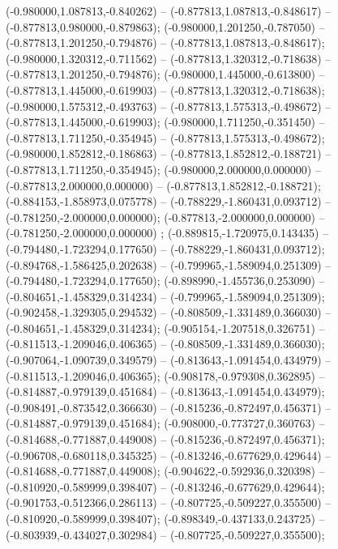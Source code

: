  (-0.980000,1.087813,-0.840262) -- (-0.877813,1.087813,-0.848617) -- (-0.877813,0.980000,-0.879863);
 (-0.980000,1.201250,-0.787050) -- (-0.877813,1.201250,-0.794876) -- (-0.877813,1.087813,-0.848617);
 (-0.980000,1.320312,-0.711562) -- (-0.877813,1.320312,-0.718638) -- (-0.877813,1.201250,-0.794876);
 (-0.980000,1.445000,-0.613800) -- (-0.877813,1.445000,-0.619903) -- (-0.877813,1.320312,-0.718638);
 (-0.980000,1.575312,-0.493763) -- (-0.877813,1.575313,-0.498672) -- (-0.877813,1.445000,-0.619903);
 (-0.980000,1.711250,-0.351450) -- (-0.877813,1.711250,-0.354945) -- (-0.877813,1.575313,-0.498672);
 (-0.980000,1.852812,-0.186863) -- (-0.877813,1.852812,-0.188721) -- (-0.877813,1.711250,-0.354945);
 (-0.980000,2.000000,0.000000) -- (-0.877813,2.000000,0.000000) -- (-0.877813,1.852812,-0.188721);
 (-0.884153,-1.858973,0.075778) -- (-0.788229,-1.860431,0.093712) -- (-0.781250,-2.000000,0.000000);
 (-0.877813,-2.000000,0.000000) -- (-0.781250,-2.000000,0.000000) ;
 (-0.889815,-1.720975,0.143435) -- (-0.794480,-1.723294,0.177650) -- (-0.788229,-1.860431,0.093712);
 (-0.894768,-1.586425,0.202638) -- (-0.799965,-1.589094,0.251309) -- (-0.794480,-1.723294,0.177650);
 (-0.898990,-1.455736,0.253090) -- (-0.804651,-1.458329,0.314234) -- (-0.799965,-1.589094,0.251309);
 (-0.902458,-1.329305,0.294532) -- (-0.808509,-1.331489,0.366030) -- (-0.804651,-1.458329,0.314234);
 (-0.905154,-1.207518,0.326751) -- (-0.811513,-1.209046,0.406365) -- (-0.808509,-1.331489,0.366030);
 (-0.907064,-1.090739,0.349579) -- (-0.813643,-1.091454,0.434979) -- (-0.811513,-1.209046,0.406365);
 (-0.908178,-0.979308,0.362895) -- (-0.814887,-0.979139,0.451684) -- (-0.813643,-1.091454,0.434979);
 (-0.908491,-0.873542,0.366630) -- (-0.815236,-0.872497,0.456371) -- (-0.814887,-0.979139,0.451684);
 (-0.908000,-0.773727,0.360763) -- (-0.814688,-0.771887,0.449008) -- (-0.815236,-0.872497,0.456371);
 (-0.906708,-0.680118,0.345325) -- (-0.813246,-0.677629,0.429644) -- (-0.814688,-0.771887,0.449008);
 (-0.904622,-0.592936,0.320398) -- (-0.810920,-0.589999,0.398407) -- (-0.813246,-0.677629,0.429644);
 (-0.901753,-0.512366,0.286113) -- (-0.807725,-0.509227,0.355500) -- (-0.810920,-0.589999,0.398407);
 (-0.898349,-0.437133,0.243725) -- (-0.803939,-0.434027,0.302984) -- (-0.807725,-0.509227,0.355500);
